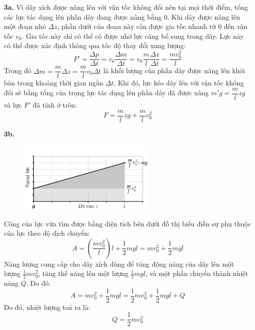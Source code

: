\noindent\textbf{3a.} Vì dây xích được nâng lên với vận tốc không đổi nên tại mọi thời điểm, tổng các lực tác dụng lên phần dây đang được nâng bằng 0. Khi dây được nâng lên một đoạn nhỏ $\Delta z$, phần dưới của đoạn này cần được gia tốc nhanh từ 0 đến vận tốc $v_0$. Gia tốc này chỉ có thể có được nhờ lực căng bổ sung trong dây. Lực này có thể được xác định thông qua tốc độ thay đổi xung lượng:
\begin{equation*}
  F' = \frac{\Delta p}{\Delta t} = v_0 \frac{\Delta m}{\Delta t} = v_0 \frac{m}{l} \frac{\Delta z}{\Delta t} = \frac{mv_0^2}{l}
\end{equation*}
Trong đó $\Delta m = \dfrac{m}{l} \Delta z = \dfrac{m}{l}v_0 \Delta t$ là khối lượng của phần dây được nâng lên khỏi bàn trong khoảng thời gian ngắn $\Delta t$. Khi đó, lực kéo dây lên với vận tốc không đổi sẽ bằng tổng của trọng lực tác dụng lên phần dây đã được nâng $m'g = \dfrac{m}{l} z g$ và lực $F'$ đã tính ở trên:
\begin{equation*}
  F = \frac{m}{l} z g + \frac{m}{l} v_0^2
\end{equation*}

\noindent\textbf{3b.}
\begin{figure}[H]
  \centering
  \includegraphics[width=0.6\textwidth]{Figures/Solutions/Fig 1.4.png}
\end{figure}

\noindent Công của lực vừa tìm được bằng diện tích bên dưới đồ thị biểu diễn sự phụ thuộc của lực theo độ dịch chuyển:
\begin{equation*}
  A = \left(\frac{mv_0^2}{l}\right) l + \frac{1}{2}mgl = mv_0^2 + \frac{1}{2}mgl
\end{equation*}
Năng lượng cung cấp cho dây xích dùng để tăng động năng của dây lên một lượng $\frac{1}{2}mv_0^2$, tăng thế năng lên một lượng $\frac{1}{2}mgl$, và một phần chuyển thành nhiệt năng $Q$. Do đó:
\begin{equation*}
  A = mv_0^2 + \frac{1}{2}mgl = \frac{1}{2}mv_0^2 + \frac{1}{2}mgl + Q
\end{equation*}
Do đó, nhiệt lượng toả ra là:
\begin{equation*}
  Q = \frac{1}{2}mv_0^2
\end{equation*}




